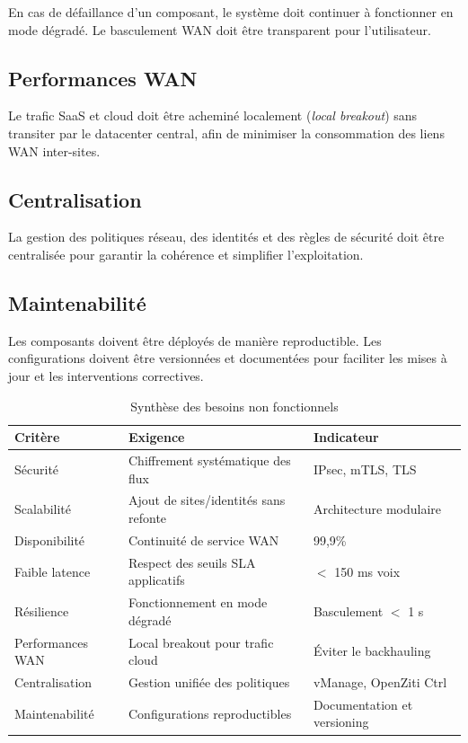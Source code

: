 \documentclass[12pt,a4paper,oneside]{report}
\begin{document}
	En cas de défaillance d'un composant, le système doit continuer à fonctionner
	en mode dégradé. Le basculement WAN doit être transparent pour l'utilisateur.
	
	\subsection{Performances WAN}
	
	Le trafic SaaS et cloud doit être acheminé localement (\textit{local breakout})
	sans transiter par le datacenter central, afin de minimiser la consommation
	des liens WAN inter-sites.
	
	\subsection{Centralisation}
	
	La gestion des politiques réseau, des identités et des règles de sécurité
	doit être centralisée pour garantir la cohérence et simplifier l'exploitation.
	
	\subsection{Maintenabilité}
	
	Les composants doivent être déployés de manière reproductible. Les configurations
	doivent être versionnées et documentées pour faciliter les mises à jour et les
	interventions correctives.
	
	\begin{table}[H]
		\centering
		\caption{Synthèse des besoins non fonctionnels}
		\renewcommand{\arraystretch}{1.4}
		\begin{tabularx}{\textwidth}{|l|X|l|}
			\hline
			\textbf{Critère} & \textbf{Exigence} & \textbf{Indicateur} \\
			\hline
			Sécurité & Chiffrement systématique des flux & IPsec, mTLS, TLS \\
			\hline
			Scalabilité & Ajout de sites/identités sans refonte & Architecture modulaire \\
			\hline
			Disponibilité & Continuité de service WAN & 99,9\% \\
			\hline
			Faible latence & Respect des seuils SLA applicatifs & $<$ 150 ms voix \\
			\hline
			Résilience & Fonctionnement en mode dégradé & Basculement $<$ 1 s \\
			\hline
			Performances WAN & Local breakout pour trafic cloud & Éviter le backhauling \\
			\hline
			Centralisation & Gestion unifiée des politiques & vManage, OpenZiti Ctrl \\
			\hline
			Maintenabilité & Configurations reproductibles & Documentation et versioning \\
			\hline
		\end{tabularx}
	\end{table}
	
\end{document}

